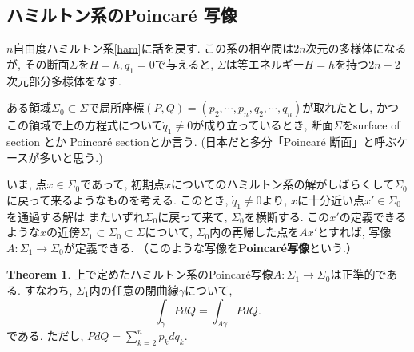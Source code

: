 \documentclass[a4paper]{ujarticle}
\numberwithin{equation}{section}
\theoremstyle{definition}
\newtheorem{theorem}{Theorem}
\begin{document}
    \subsection{ハミルトン系のPoincar\'{e} 写像}

    $n$自由度ハミルトン系\eqref{ham}に話を戻す.
    この系の相空間は$2n$次元の多様体になるが, その断面$\Sigma$を$H = h, q_1 = 0$で与えると, 
    $\Sigma$は等エネルギー$H = h$を持つ$2n - 2$次元部分多様体をなす.

    ある領域$\Sigma_0 \subset \Sigma$で局所座標$(P, Q) = (p_2, \cdots, p_n, q_2, \cdots, q_n)$が取れたとし,
    かつこの領域で上の方程式について$\dot{q}_1 \neq 0$が成り立っているとき, 
    断面$\Sigma$をsurface of section とか Poincar\'{e} sectionとか言う.
    (日本だと多分「Poincar\'{e} 断面」と呼ぶケースが多いと思う.)

    いま, 点$x \in \Sigma_0$であって, 
    初期点$x$についてのハミルトン系の解がしばらくして$\Sigma_0$に戻って来るようなものを考える.
    このとき, $\dot{q}_1 \neq 0$より, $x$に十分近い点$x' \in \Sigma_0$を通過する解は
    またいずれ$\Sigma_0$に戻って来て, $\Sigma_0$を横断する.
    この$x'$の定義できるような$x$の近傍$\Sigma_1 \subset \Sigma_0 \subset \Sigma$について, 
    $\Sigma_0$内の再帰した点を$Ax'$とすれば, 
    写像$A: \Sigma_1 \rightarrow \Sigma_0$が定義できる. 
    （このような写像を\textbf{Poincar\'{e}写像}という.）

    \begin{theorem} \label{th:A31.5}
        上で定めたハミルトン系のPoincar\'{e}写像$A: \Sigma_1 \rightarrow \Sigma_0$は正準的である.
        すなわち, $\Sigma_1$内の任意の閉曲線$\gamma$について, 
        \begin{equation} \label{A31.5}
            \int_{\gamma} P dQ = \int_{A \gamma} P dQ.
        \end{equation}
        である.
        ただし, $P dQ = \sum_{k = 2}^{n} p_k d q_k$.
    \end{theorem}
\end{document}
